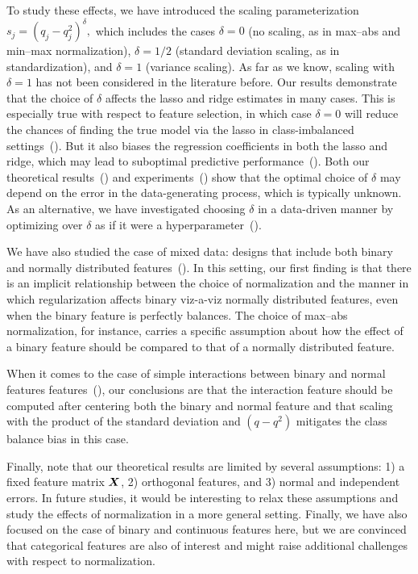 To study these effects, we have introduced the scaling parameterization $s_j = (q_j -
  q_j^2)^\delta,$ which includes the cases \(\delta=0\) (no scaling, as in max--abs and
min--max normalization), \(\delta = 1/2\) (standard deviation scaling, as in
standardization), and \(\delta=1\) (variance scaling). As far as we know, scaling with
\(\delta=1\) has not been considered in the literature before. Our results demonstrate that
the choice of \(\delta\) affects the lasso and ridge estimates in many cases. This is
especially true with respect to feature selection, in which case \(\delta=0\) will reduce
the chances of finding the true model via the lasso in class-imbalanced
settings~(). But it also biases the regression coefficients
in both the lasso and ridge, which may lead to suboptimal predictive
performance~(). Both our theoretical
results~() and
experiments~() show that the optimal choice of \(\delta\) may
depend on the error in the data-generating process, which is typically unknown. As an
alternative, we have investigated choosing \(\delta\) in a data-driven manner by optimizing
over \(\delta\) as if it were a hyperparameter~().

We have also studied the case of mixed data: designs that include both binary and normally
distributed features~(). In this setting, our first finding is that
there is an implicit relationship between the choice of normalization and the manner in
which regularization affects binary viz-a-viz normally distributed features, even when the
binary feature is perfectly balances. The choice of max--abs normalization, for instance,
carries a specific assumption about how the effect of a binary feature should be compared
to that of a normally distributed feature.

When it comes to the case of simple interactions between binary and normal features
features~(), our conclusions are that the interaction
feature should be computed after centering both the binary and normal feature and that
scaling with the product of the standard deviation and \((q-q^2)\) mitigates the class
balance bias in this case.

Finally, note that our theoretical results are limited by several assumptions: 1) a fixed
feature matrix \(\boldsymbol{X}\), 2) orthogonal features, and 3) normal and independent errors.
In future studies, it would be interesting to relax these assumptions and study the effects
of normalization in a more general setting. Finally, we have also focused on the case of
binary and continuous features here, but we are convinced that categorical features are
also of interest and might raise additional challenges with respect to normalization.
